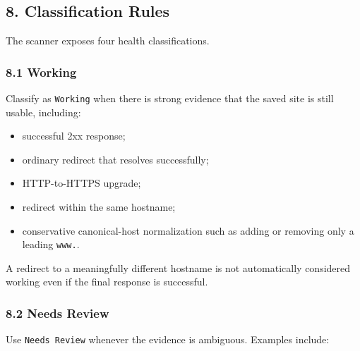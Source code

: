 \documentclass[
  letterpaper,
]{article}
\newcommand{\passthrough}[1]{#1}
\providecommand{\tightlist}{%
  \setlength{\itemsep}{0pt}\setlength{\parskip}{0pt}}
\begin{document}
\subsection{8. Classification Rules}\label{8-classification-rules}

The scanner exposes four health classifications.

\subsubsection{8.1 Working}\label{81-working}

Classify as \passthrough{\lstinline!Working!} when there is strong evidence that the saved site is still usable,
including:

\begin{itemize}
\tightlist
\item
  successful 2xx response;
\item
  ordinary redirect that resolves successfully;
\item
  HTTP-to-HTTPS upgrade;
\item
  redirect within the same hostname;
\item
  conservative canonical-host normalization such as adding or removing only a leading \passthrough{\lstinline!www.!}.
\end{itemize}

A redirect to a meaningfully different hostname is not automatically considered working even if the final response is
successful.

\subsubsection{8.2 Needs Review}\label{82-needs-review}

Use \passthrough{\lstinline!Needs Review!} whenever the evidence is ambiguous. Examples include:
\end{document}

